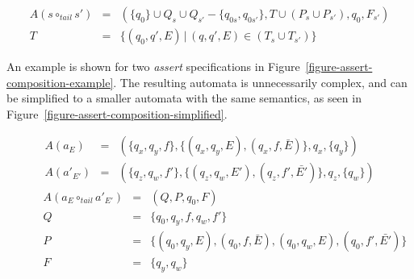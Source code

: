 \documentclass[a4paper,11pt]{kth-mag}
\begin{document}
\[
  \begin{array}{rcl}
    A(s \circ_{tail} s') & = & (\{q_0\} \cup Q_s \cup Q_{s'} - \{q_{0s}, q_{0s'}\}, T \cup (P_s \cup P_{s'}), q_0, F_{s'}) \\
                     T   & = & \{(q_0, q', E) \, | \, (q, q', E) \in (T_s \cup T_{s'})\}
  \end{array}
\]

An example is shown for two \textit{assert} specifications in
Figure~\ref{figure-assert-composition-example}. The resulting automata is
unnecessarily complex, and can be simplified to a smaller automata with the
same semantics, as seen in Figure~\ref{figure-assert-composition-simplified}.


\begin{figure}[h!]
	\begin{minipage}{0.90\textwidth}
		\centering
    \[
      \begin{array}{rcl}
        A(a_E) & = & (\{q_x, q_y, f\}, \{(q_x, q_y, E), (q_x, f, \bar{E})\}, q_x, \{q_y\}) \\
    A(a'_{E'}) & = & (\{q_z, q_w, f'\}, \{(q_z, q_w, E') ,(q_z, f', \bar{E'})\}, q_z, \{q_w\})
      \end{array}
    \]
		\centering
    \[
      \begin{array}{rcl}
        A(a_E \circ_{tail} a'_{E'}) & = & (Q, P, q_0, F) \\
                                 Q & = & \{q_0, q_y, f, q_w, f'\} \\
                                 P & = & \{(q_0, q_y, E), (q_0, f, \bar{E}), (q_0, q_w, E), (q_0, f', \bar{E'})\} \\
                                 F & = & \{q_y, q_w\}
      \end{array}
    \]
	\end{minipage}

  \bigskip


\end{figure}
\end{document}
